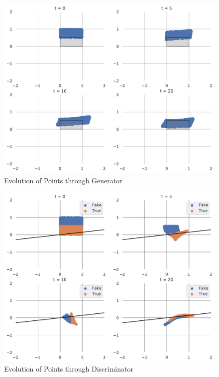 \begin{figure}[H]
    \centering
    \includegraphics[width = 13cm]{Evo_3.pdf}
    \caption{Evolution of Points through Generator}
    \label{fig:GAN-gen}
\end{figure}
\begin{figure}[H]
    \centering
    \includegraphics[width = 13cm]{Evo_4.pdf}
    \caption{Evolution of Points through Discriminator}
    \label{fig:GAN-disc}
\end{figure}
